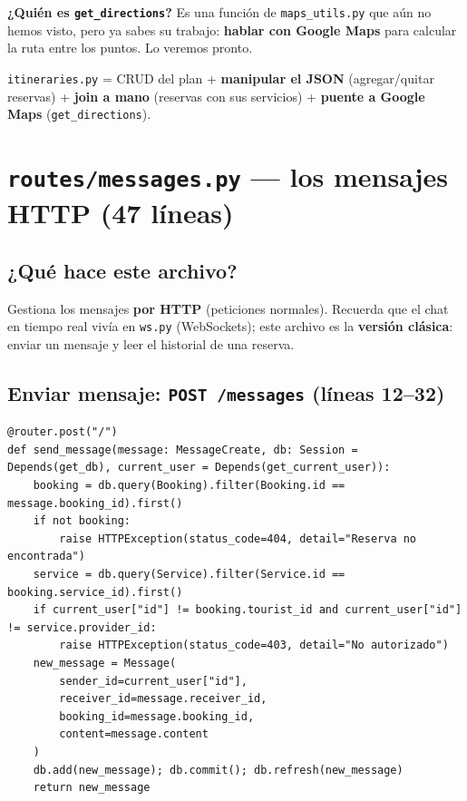 \documentclass[11pt,a4paper]{article}
\begin{document}
\textbf{¿Quién es \texttt{get\_directions}?} Es una función de \texttt{maps\_utils.py} que aún no
hemos visto, pero ya sabes su trabajo: \textbf{hablar con Google Maps} para calcular la ruta
entre los puntos. Lo veremos pronto.

\begin{recuadro}
\texttt{itineraries.py} = CRUD del plan + \textbf{manipular el JSON} (agregar/quitar reservas)
+ \textbf{join a mano} (reservas con sus servicios) + \textbf{puente a Google Maps}
(\texttt{get\_directions}).
\end{recuadro}

\section{\texttt{routes/messages.py} --- los mensajes HTTP (47 líneas)}

\subsection{¿Qué hace este archivo?}

Gestiona los mensajes \textbf{por HTTP} (peticiones normales). Recuerda que el chat en tiempo
real vivía en \texttt{ws.py} (WebSockets); este archivo es la \textbf{versión clásica}:
enviar un mensaje y leer el historial de una reserva.

\subsection{Enviar mensaje: \texttt{POST /messages} (líneas 12--32)}

\begin{lstlisting}
@router.post("/")
def send_message(message: MessageCreate, db: Session = Depends(get_db), current_user = Depends(get_current_user)):
    booking = db.query(Booking).filter(Booking.id == message.booking_id).first()
    if not booking:
        raise HTTPException(status_code=404, detail="Reserva no encontrada")
    service = db.query(Service).filter(Service.id == booking.service_id).first()
    if current_user["id"] != booking.tourist_id and current_user["id"] != service.provider_id:
        raise HTTPException(status_code=403, detail="No autorizado")
    new_message = Message(
        sender_id=current_user["id"],
        receiver_id=message.receiver_id,
        booking_id=message.booking_id,
        content=message.content
    )
    db.add(new_message); db.commit(); db.refresh(new_message)
    return new_message
\end{lstlisting}
\end{document}
